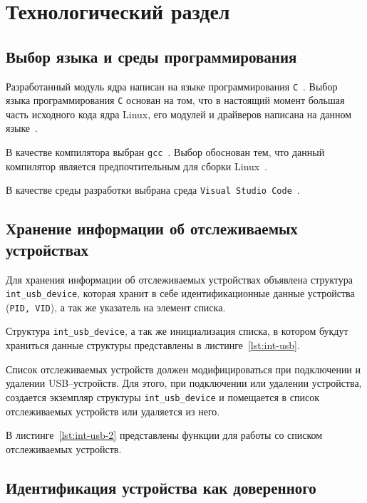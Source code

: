 \chapter{Технологический раздел}

\section{Выбор языка и среды программирования}

Разработанный модуль ядра написан на языке программирования \texttt{C}~\cite{c-language}. Выбор языка программирования \texttt{С} основан на том, что в настоящий момент большая часть исходного кода ядра Linux, его модулей и драйверов написана на данном языке~\cite{rust-in-linux}.

В качестве компилятора выбран \texttt{gcc}~\cite{gcc}. Выбор обоснован тем, что данный компилятор является предпочтительным для сборки Linux~\cite{build-linux}.

В качестве среды разработки выбрана среда \texttt{Visual Studio Code}~\cite{vscode}.

\section{Хранение информации об отслеживаемых устройствах}

Для хранения информации об отслеживаемых устройствах объявлена структура \texttt{int\_usb\_device}, которая хранит в себе идентификационные данные устройства (\texttt{PID, VID}), а так же указатель на элемент списка.

Структура \texttt{int\_usb\_device}, а так же инициализация списка, в котором букдут храниться данные структуры представлены в листинге~\ref{lst:int-usb}.


Список отслеживаемых устройств должен модифицироваться при подключении и удалении USB--устройств. Для этого, при подключении или удалении устройства, создается экземпляр структуры \texttt{int\_usb\_device} и помещается в список отслеживаемых устройств или удаляется из него.

В листинге~\ref{lst:int-usb-2} представлены функции для работы со списком отслеживаемых устройств.

\section{Идентификация устройства как доверенного}

